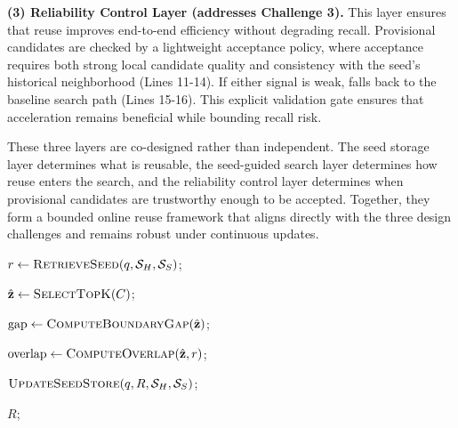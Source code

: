 \noindent\textbf{(3) Reliability Control Layer (addresses Challenge 3).}
This layer ensures that reuse improves end-to-end efficiency without degrading recall. 
Provisional candidates are checked by a lightweight acceptance policy, where acceptance requires both strong local candidate quality and consistency with the seed's historical neighborhood (Lines 11-14). 
If either signal is weak, \system falls back to the baseline search path (Lines 15-16). 
This explicit validation gate ensures that acceleration remains beneficial while bounding recall risk.

These three layers are co-designed rather than independent. 
The seed storage layer determines what is reusable, the seed-guided search layer determines how reuse enters the search, and the reliability control layer determines when provisional candidates are trustworthy enough to be accepted. 
Together, they form a bounded online reuse framework that aligns directly with the three design challenges and remains robust under continuous updates.




\begin{algorithm}[t] 
\small
\caption{Query Process of \system} 
\label{algo:Seed Online Reuse}
\LinesNumbered 
{} 

$r \leftarrow \textsc{RetrieveSeed}(q,\mathcal{S}_H,\mathcal{S}_S)$;  



$\hat{\mathbf{z}} \leftarrow \textsc{SelectTopK}(C)$; 



$\mathrm{gap} \leftarrow \textsc{ComputeBoundaryGap}(\hat{\mathbf{z}})$;

$\mathrm{overlap} \leftarrow \textsc{ComputeOverlap}(\hat{\mathbf{z}}, r)$;



$\textsc{UpdateSeedStore}(q,R,\mathcal{S}_H,\mathcal{S}_S)$;

\Return $R$;
\end{algorithm}

